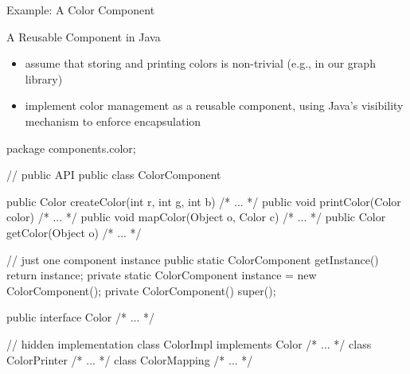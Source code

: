\begin{frame}[fragile]{Example: A Color Component \mytitlesource{\fospl}}
	\begin{mycolumns}[widths={40}]
			\begin{example}{A Reusable Component in Java}
				\begin{itemize}
					\item assume that storing and printing colors is non-trivial (e.g., in our graph library)
					\item implement color management as a reusable component, using Java's visibility mechanism to enforce encapsulation
				\end{itemize}
			\end{example}
		\mynextcolumn
\begin{codetight}{}
package components.color;

// public API
public class ColorComponent {
	public Color createColor(int r, int g, int b) { /* ... */ }
	public void printColor(Color color) { /* ... */ }
	public void mapColor(Object o, Color c) { /* ... */ }
	public Color getColor(Object o) { /* ... */ }
	
	// just one component instance
	public static ColorComponent getInstance() { return instance; }
	private static ColorComponent instance = new ColorComponent();
	private ColorComponent() { super(); }
}
public interface Color { /* ... */ }

// hidden implementation
class ColorImpl implements Color { /* ... */ }
class ColorPrinter { /* ... */ }
class ColorMapping { /* ... */ }
\end{codetight}
	\end{mycolumns}
\end{frame}

